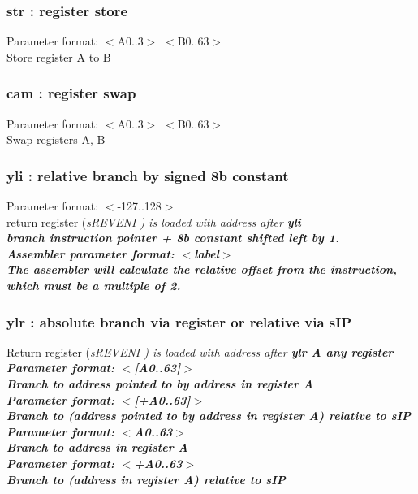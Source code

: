 \documentclass[a4paper,11pt]{article}
\begin{document}
\subsubsection{str : register store} 
 Parameter format: $<$A0..3$>$ $<$B0..63$>$\\
 Store register A to B 

\subsubsection{cam : register swap} 
 Parameter format: $<$A0..3$>$ $<$B0..63$>$\\
 Swap registers A, B
 
\subsubsection{yli : relative branch by signed 8b constant} 
 Parameter format: $<$-127..128$>$\\
 return register (\sl sREVENI \rm) is loaded with address after \bf yli\rm\\
 branch instruction pointer + 8b constant shifted left by 1.\\
 Assembler parameter format: $<$label$>$\\
 The assembler will calculate the relative offset from the instruction, which must be a multiple of 2.\\

\subsubsection{ylr : absolute branch via register or relative via sIP} 
 Return register (\sl sREVENI \rm) is loaded with address after \bf ylr\rm
 A any register\\
 
 Parameter format: $<$[A0..63]$>$\\
  Branch to address pointed to by address in register A\\
 
 Parameter format: $<$[+A0..63]$>$\\
  Branch to (address pointed to by address in register A) relative to \sl sIP \rm\\
 
 Parameter format: $<$A0..63$>$\\
  Branch to address in register A\\
 
 Parameter format: $<$+A0..63$>$\\
  Branch to (address in register A) relative to \sl sIP \rm\\
 
\end{document}

